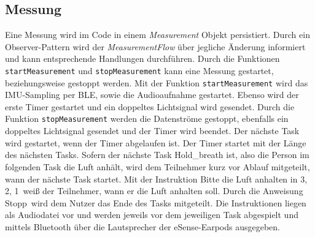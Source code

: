 \subsection{Messung}
\label{ch:Implementierung:app:measurement}
Eine Messung wird im Code in einem \textit{Measurement} Objekt persistiert.
Durch ein Observer-Pattern wird der \textit{MeasurementFlow} über jegliche Änderung informiert und kann entsprechende Handlungen durchführen.
Durch die Funktionen \texttt{startMeasurement} und \texttt{stopMeasurement} kann eine Messung gestartet, beziehungsweise gestoppt werden.
Mit der Funktion \texttt{startMeasurement} wird das IMU-Sampling per BLE, sowie die Audioaufnahme gestartet. 
Ebenso wird der erste Timer gestartet und ein doppeltes Lichtsignal wird gesendet. 
Durch die Funktion \texttt{stopMeasurement} werden die Datenströme gestoppt, ebenfalls ein doppeltes Lichtsignal gesendet und der Timer wird beendet.
Der nächste Task wird gestartet, wenn der Timer abgelaufen ist. Der Timer startet mit der Länge des nächsten Tasks.
Sofern der nächste Task {\glqq Hold\_breath\grqq} ist, also die Person im folgenden Task die Luft anhält, wird dem Teilnehmer kurz vor Ablauf mitgeteilt, wann der nächste Task startet.
Mit der Instruktion \glqq Bitte die Luft anhalten in 3, 2, 1\grqq \ weiß der Teilnehmer, wann er die Luft anhalten soll.
Durch die Anweisung \glqq Stopp\grqq \ wird dem Nutzer das Ende des Tasks mitgeteilt. 
Die Instruktionen liegen als Audiodatei vor und werden jeweils vor dem jeweiligen Task abgespielt und mittels Bluetooth über die Lautsprecher der eSense-Earpods ausgegeben.


